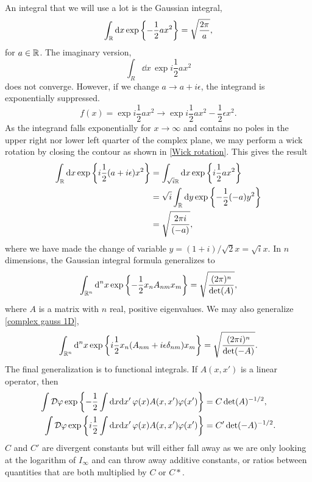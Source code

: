 An integral that we will use a lot is the Gaussian integral,
%
\begin{equation}
    \int_{\mathbb{R}} \text{d} x \, \text{exp} \left\{ - \frac{1}{2} a x^2 \right\} = \sqrt{\frac{2 \pi}{a}},
\end{equation}
%
for $a \in \mathbb{R}$. The imaginary version,
%
\begin{equation}
    \int_R \dd x \, \exp{i \frac{1}{2} a x^2 }
\end{equation}
%
does not converge. However, if we change $a \rightarrow a + i\epsilon$, the integrand is exponentially suppressed.
%
\begin{equation}
    f(x) = \exp{i \frac{1}{2}a x^2} \rightarrow
    \exp{i\frac{1}{2}a x^2 - \frac{1}{2} \epsilon  x^2}.
\end{equation}
%
As the integrand falls exponentially for $x\rightarrow \infty$ and contains no poles in the upper right nor lower left quarter of the complex plane, we may perform a wick rotation by closing the contour as shown in \autoref{Wick rotation}.
This gives the result
%
\begin{align}
    \label{complex gauss 1D}
    \nonumber
    \int_{\mathbb{R}} \text{d} x \, \text{exp} \left\{ i \frac{1}{2}(a + i\epsilon) x^2 \right\}
    & = \int_{\sqrt{i}\mathbb{R}} \text{d} x \, \text{exp} \left\{ i\frac{1}{2} ax^2 \right\} 
    \\ \nonumber &
    = \sqrt{i} \int_{\mathbb{R}} \text{d} y\, \text{exp} \left\{ -\frac{1}{2} (-a) y^2 \right\}
    \\ &
    = \sqrt{\frac{2 \pi i}{(-a)}},
\end{align}
%
where we have made the change of variable $y = (1+i)/\sqrt{2} x = \sqrt{i} x$.
In $n$ dimensions, the Gaussian integral formula generalizes to
%
\begin{equation}
    \int_{\mathbb{R}^n} \text{d}^n x \, \text{exp} \left\{ -\frac{1}{2} x_n A_{nm} x_m  \right\} 
    =\sqrt{\frac{(2 \pi)^n}{\det(A)}},
\end{equation}
%
where $A$ is a matrix with $n$ real, positive eigenvalues.
We may also generalize \autoref{complex gauss 1D},
%
\begin{align}
    \int_{\mathbb{R}^n} \text{d}^n x \, \text{exp} \left\{ i\frac{1}{2} x_n( A_{nm} + i \epsilon \delta_{nm}) x_m  \right\} =\sqrt{\frac{(2 \pi i )^n}{\det(-A)}}.
\end{align}
%
The final generalization is to functional integrals.
If $A(x, x')$ is a linear operator, then
%
\begin{align}
    \nonumber
    \int \mathcal D \varphi \, \text{exp} \left\{ - \frac{1}{2} \int \text{d} x \text{d} x' \, \varphi(x) A(x, x') \varphi(x')  \right\}
    &= C \det(A)^{-1/2} ,\\
    \int \mathcal D \varphi \, \text{exp} \left\{ i\frac{1}{2} \int \text{d} x \text{d} x'\, \varphi(x) A(x, x') \varphi(x')  \right\}
    &= C' \det(-A)^{-1/2}.
\end{align}
%
$C$ and $C'$ are divergent constants but will either fall away as we are only looking at the logarithm of $I_\infty$ and can throw away additive constants, or ratios between quantities that are both multiplied by $C$ or $C*$.

